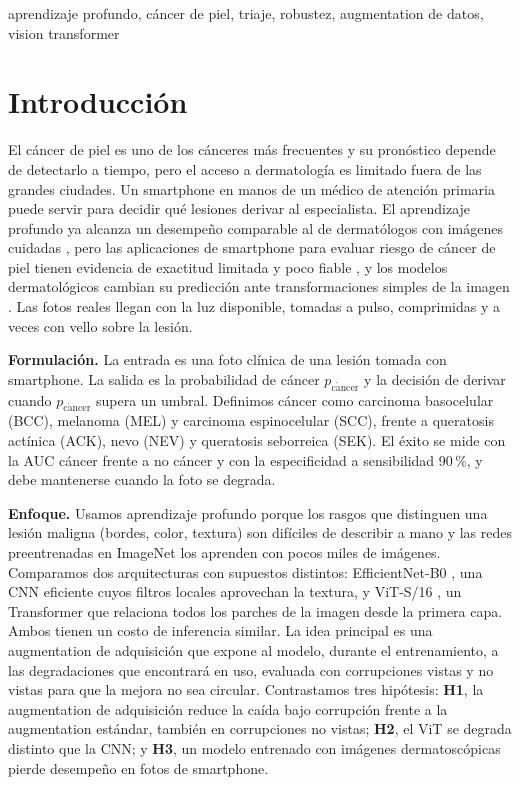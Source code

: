 \documentclass[conference]{IEEEtran}
\newcommand{\pc}{p_{\mathrm{c\acute{a}ncer}}}
\begin{document}
\begin{IEEEkeywords}
aprendizaje profundo, cáncer de piel, triaje, robustez, augmentation de datos, vision transformer
\end{IEEEkeywords}

\section{Introducción}

El cáncer de piel es uno de los cánceres más frecuentes y su pronóstico depende de detectarlo a tiempo, pero el acceso a dermatología es limitado fuera de las grandes ciudades. Un smartphone en manos de un médico de atención primaria puede servir para decidir qué lesiones derivar al especialista. El aprendizaje profundo ya alcanza un desempeño comparable al de dermatólogos con imágenes cuidadas \cite{esteva2017}, pero las aplicaciones de smartphone para evaluar riesgo de cáncer de piel tienen evidencia de exactitud limitada y poco fiable \cite{freeman2020}, y los modelos dermatológicos cambian su predicción ante transformaciones simples de la imagen \cite{young2021,maron2021}. Las fotos reales llegan con la luz disponible, tomadas a pulso, comprimidas y a veces con vello sobre la lesión.

\textbf{Formulación.} La entrada es una foto clínica de una lesión tomada con smartphone. La salida es la probabilidad de cáncer $\pc$ y la decisión de derivar cuando $\pc$ supera un umbral. Definimos cáncer como carcinoma basocelular (BCC), melanoma (MEL) y carcinoma espinocelular (SCC), frente a queratosis actínica (ACK), nevo (NEV) y queratosis seborreica (SEK). El éxito se mide con la AUC cáncer frente a no cáncer y con la especificidad a sensibilidad 90\,\%, y debe mantenerse cuando la foto se degrada.

\textbf{Enfoque.} Usamos aprendizaje profundo porque los rasgos que distinguen una lesión maligna (bordes, color, textura) son difíciles de describir a mano y las redes preentrenadas en ImageNet los aprenden con pocos miles de imágenes. Comparamos dos arquitecturas con supuestos distintos: EfficientNet-B0 \cite{tan2019}, una CNN eficiente cuyos filtros locales aprovechan la textura, y ViT-S/16 \cite{dosovitskiy2021}, un Transformer \cite{vaswani2017} que relaciona todos los parches de la imagen desde la primera capa. Ambos tienen un costo de inferencia similar. La idea principal es una augmentation de adquisición que expone al modelo, durante el entrenamiento, a las degradaciones que encontrará en uso, evaluada con corrupciones vistas y no vistas para que la mejora no sea circular. Contrastamos tres hipótesis: \textbf{H1}, la augmentation de adquisición reduce la caída bajo corrupción frente a la augmentation estándar, también en corrupciones no vistas; \textbf{H2}, el ViT se degrada distinto que la CNN; y \textbf{H3}, un modelo entrenado con imágenes dermatoscópicas pierde desempeño en fotos de smartphone.
\end{document}
